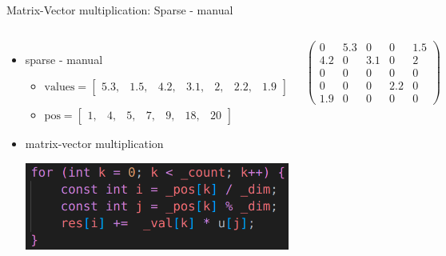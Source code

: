 \documentclass[aspectratio=169,xcolor=dvipsnames]{beamer}
\begin{document}

\begin{frame}{Matrix-Vector multiplication: Sparse - manual}
    \begin{columns}[c] %

\begin{itemize}
\item sparse - manual
  \begin{itemize}
     	\item $\mathrm{values} =  \begin{bmatrix} 
		5.3, & 1.5, & 4.2, & 3.1, & 2, & 2.2, & 1.9 
		\end{bmatrix}$

		\item $\mathrm{pos} = \begin{bmatrix}
		1, & 4, & 5, & 7, & 9, & 18, & 20 
		\end{bmatrix}$
	\end{itemize}
\item matrix-vector multiplication
\begin{center}
    \includegraphics[width=0.8\linewidth]{matrix_vector_man2.png}
    \end{center}
\end{itemize}

        
        $ \left( \begin{array}{rrrrr} 
0 & 5.3 & 0 & 0 & 1.5\\ 
4.2 & 0& 3.1 & 0 & 2\\ 
0 & 0 & 0 & 0 & 0 \\
0 & 0 & 0 & 2.2 & 0 \\
1.9 & 0 & 0 & 0 & 0
\end{array} \right) $

    \end{columns}
\end{frame}

\end{document}
